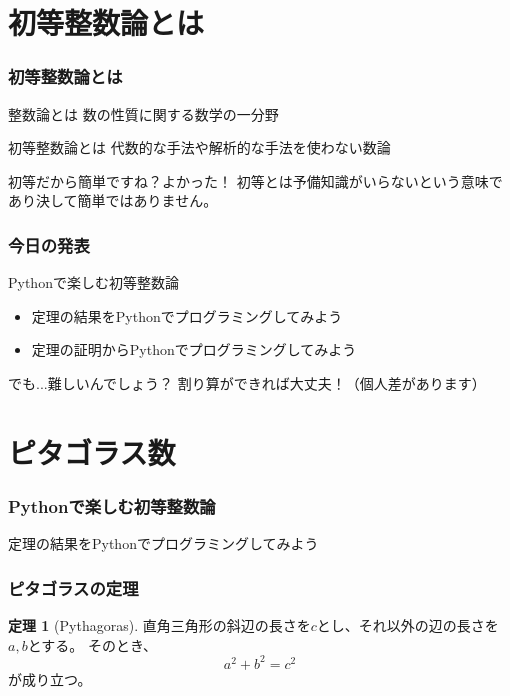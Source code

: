 \documentclass[dvipdfmx,11pt,notheorems]{beamer}
\theoremstyle{definition}
\newtheorem{theorem}{定理}
\begin{document}
\section{初等整数論とは}

\begin{frame}\frametitle{初等整数論とは}

\begin{block}{整数論とは}
数の性質に関する数学の一分野
\end{block}

\begin{block}{初等整数論とは}
代数的な手法や解析的な手法を使わない数論
\end{block}

\begin{alertblock}{初等だから簡単ですね？よかった！}
初等とは予備知識がいらないという意味であり決して簡単ではありません。
\end{alertblock}

\end{frame}

\begin{frame}\frametitle{今日の発表}

\begin{block}{Pythonで楽しむ初等整数論}
\begin{itemize}
\item 定理の結果をPythonでプログラミングしてみよう
\item 定理の証明からPythonでプログラミングしてみよう
\end{itemize}
\end{block}

\begin{exampleblock}{でも...難しいんでしょう？}
割り算ができれば大丈夫！（個人差があります）
\end{exampleblock}

\end{frame}

\section{ピタゴラス数}

\begin{frame}\frametitle{Pythonで楽しむ初等整数論}
\huge{定理の結果をPythonでプログラミングしてみよう}
\end{frame}

\begin{frame}\frametitle{ピタゴラスの定理}

\begin{theorem}[Pythagoras]
直角三角形の斜辺の長さを$c$とし、それ以外の辺の長さを$a, b$とする。
そのとき、
\begin{equation*}
a^{2} + b^{2} = c^{2}
\end{equation*}
 が成り立つ。
\end{theorem}

\end{frame}
\end{document}
